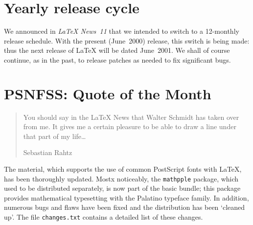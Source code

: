 \documentclass{ltnews}
\providecommand\pkg[1]{\texttt{#1}}
\providecommand\file[1]{\texttt{#1}}
\begin{document}
\maketitle

\raisefirstsection
\section{Yearly release cycle}

We announced in \textit{\LaTeX{} News~11} that we intended to switch
to a 12-monthly release schedule.  With the present (June~2000)
release, this switch is being made: thus the next release of \LaTeX{}
will be dated June~2001.  We shall of course continue, as in the past,
to release patches as needed to fix significant bugs.

  \begin{latexonly}
    \vspace{-0.2\baselineskip}
    \enlargethispage{\baselineskip}
  \end{latexonly}

\section{PSNFSS: \small Quote of the Month}

\begin{quote}
  You should say in the \LaTeX{} News that Walter Schmidt has taken over
  \PSNFSS{} from me. It gives me a certain pleasure to be able to draw a
  line under that part of my life\ldots

  \begin{latexonly}
    \vspace{-\baselineskip}
  \end{latexonly}

  \begin{flushright}
    Sebastian Rahtz
  \end{flushright}
\end{quote}

\begin{latexonly}
  \vspace{-\baselineskip}
\end{latexonly}

\noindent
The \PSNFSS{} material, which supports the use\latex{\\}
of common PostScript fonts with \LaTeX{}, has been thoroughly updated.
Mostx noticeably, the \pkg{mathpple} package, which used to be
distributed separately, is now part of the basic \PSNFSS{} bundle;
this package provides mathematical typesetting with the Palatino
typeface family.  In addition, numerous bugs and flaws have been fixed
and the distribution has been `cleaned up'.  The file
\file{changes.txt} contains a detailed list of these changes.
\end{document}

